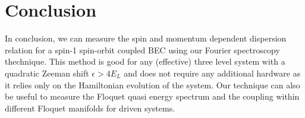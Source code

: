 \section{Conclusion}

In conclusion, we can measure the spin and momentum dependent dispersion relation for a spin-1 spin-orbit coupled BEC using our Fourier spectroscopy thechnique. This method is good for any (effective) three level system with a quadratic Zeeman shift $\epsilon>4E_L$ and does not require any additional hardware as it relies only on the Hamiltonian evolution of the system. Our technique can also be useful to measure the Floquet quasi energy spectrum and the coupling within different Floquet manifolds for driven systems. 